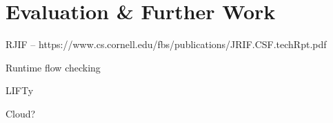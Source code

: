 \chapter{Evaluation \& Further Work}

RJIF -- https://www.cs.cornell.edu/fbs/publications/JRIF.CSF.techRpt.pdf

Runtime flow checking

LIFTy \cite{polikarpova2016lifty}

Cloud?